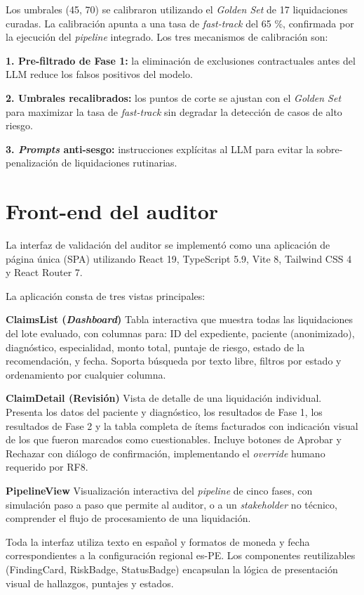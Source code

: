 Los umbrales (45, 70) se calibraron utilizando el \textit{Golden Set} de 17 liquidaciones curadas. La calibración apunta a una tasa de \textit{fast-track} del 65 \%, confirmada por la ejecución del \textit{pipeline} integrado. Los tres mecanismos de calibración son:

\noindent \textbf{1. Pre-filtrado de Fase 1:} la eliminación de exclusiones contractuales antes del LLM reduce los falsos positivos del modelo.

\noindent \textbf{2. Umbrales recalibrados:} los puntos de corte se ajustan con el \textit{Golden Set} para maximizar la tasa de \textit{fast-track} sin degradar la detección de casos de alto riesgo.

\noindent \textbf{3. \textit{Prompts} anti-sesgo:} instrucciones explícitas al LLM para evitar la sobre-penalización de liquidaciones rutinarias.

\section{Front-end del auditor}

La interfaz de validación del auditor se implementó como una aplicación de página única (SPA) utilizando React 19, TypeScript 5.9, Vite 8, Tailwind CSS 4 y React Router 7.

La aplicación consta de tres vistas principales:

\textbf{ClaimsList (\textit{Dashboard})} Tabla interactiva que muestra todas las liquidaciones del lote evaluado, con columnas para: ID del expediente, paciente (anonimizado), diagnóstico, especialidad, monto total, puntaje de riesgo, estado de la recomendación, y fecha. Soporta búsqueda por texto libre, filtros por estado y ordenamiento por cualquier columna.

\textbf{ClaimDetail (Revisión)} Vista de detalle de una liquidación individual. Presenta los datos del paciente y diagnóstico, los resultados de Fase 1, los resultados de Fase 2 y la tabla completa de ítems facturados con indicación visual de los que fueron marcados como cuestionables. Incluye botones de Aprobar y Rechazar con diálogo de confirmación, implementando el \textit{override} humano requerido por RF8.

\textbf{PipelineView} Visualización interactiva del \textit{pipeline} de cinco fases, con simulación paso a paso que permite al auditor, o a un \textit{stakeholder} no técnico, comprender el flujo de procesamiento de una liquidación.

Toda la interfaz utiliza texto en español y formatos de moneda y fecha correspondientes a la configuración regional es-PE. Los componentes reutilizables (FindingCard, RiskBadge, StatusBadge) encapsulan la lógica de presentación visual de hallazgos, puntajes y estados.

